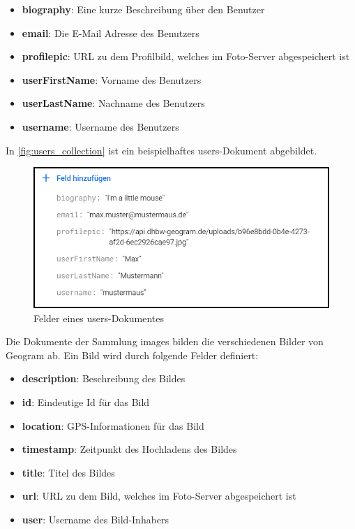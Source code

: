 \begin{itemize}
    \item \textbf{biography}: Eine kurze Beschreibung über den Benutzer
    \item \textbf{email}: Die E-Mail Adresse des Benutzers
    \item \textbf{profilepic}: URL zu dem Profilbild, welches im Foto-Server abgespeichert ist
    \item \textbf{userFirstName}: Vorname des Benutzers
    \item \textbf{userLastName}: Nachname des Benutzers
    \item \textbf{username}: Username des Benutzers
\end{itemize}

In \autoref{fig:users_collection} ist ein beispielhaftes users-Dokument abgebildet.

\begin{figure}[H]
    \centering
    \includegraphics[width=.7\linewidth]{images/collection_users.png}
    \caption{Felder eines \glqq users\grqq{}-Dokumentes}
    \label{fig:users_collection}
\end{figure}

Die Dokumente der Sammlung \glqq images\grqq{} bilden die verschiedenen Bilder von Geogram ab. Ein Bild wird durch folgende Felder definiert:

\begin{itemize}
    \item \textbf{description}: Beschreibung des Bildes
    \item \textbf{id}: Eindeutige Id für das Bild
    \item \textbf{location}: GPS-Informationen für das Bild
    \item \textbf{timestamp}: Zeitpunkt des Hochladens des Bildes
    \item \textbf{title}: Titel des Bildes
    \item \textbf{url}: URL zu dem Bild, welches im Foto-Server abgespeichert ist
    \item \textbf{user}: Username des Bild-Inhabers
\end{itemize}

